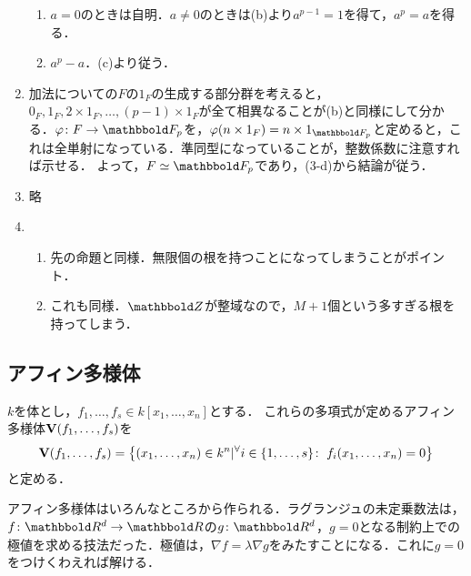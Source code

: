 \documentclass[9pt]{ltjsarticle}
\newcommand{\bbold}{\mathbbold}
\begin{document}
\begin{enumerate}[label=(問題\arabic*)]
\begin{enumerate}
 \item $a=0$のときは自明．$a\neq 0$のときは(b)より$a^{p-1}=1$を得て，$a^p=a$を得る．
 \item $a^p-a$．(c)より従う．
\end{enumerate}
 \item 加法についての$F$の$1_F$の生成する部分群を考えると，$0_F,1_F,2\times 1_F,\dots,(p-1)\times 1_F$が全て相異なることが(b)と同様にして分かる．$\varphi\colon F\to \bbold F_p$を，$\varphi(n\times 1_F)=n\times 1_{\bbold F_p}$と定めると，これは全単射になっている．準同型になっていることが，整数係数に注意すれば示せる．
よって，$F\simeq \bbold F_p$であり，(3-d)から結論が従う．
 \item 略
 \item
\begin{enumerate}[label=(\arabic*)]
 \item 先の命題と同様．無限個の根を持つことになってしまうことがポイント．
 \item これも同様．$\Z$が整域なので，$M+1$個という多すぎる根を持ってしまう．
\end{enumerate}
\end{enumerate}

\subsection{アフィン多様体}
$k$を体とし，$f_1,\dots,f_s \in k[x_1,\dots,x_n]$とする．
これらの多項式が定めるアフィン多様体$\textbf V(f_1,\dots,f_s)$を
\begin{align}
 \textbf V(f_1,\dots,f_s) =
\left\{(x_1,\dots,x_n)\in k^n | {}^{\forall}{i\in \left\{1,\dots,s\right\}}\mathrm{\colon\;} f_i(x_1,\dots,x_n)=0\right\}
\end{align}
と定める．

アフィン多様体はいろんなところから作られる．ラグランジュの未定乗数法は，
$f\colon \R^d \to \R$の$g\colon \R^d$，$g=0$となる制約上での
極値を求める技法だった．極値は，$\nabla f = \lambda \nabla g$をみたすことになる．これに$g=0$をつけくわえれば解ける．
\end{document}
